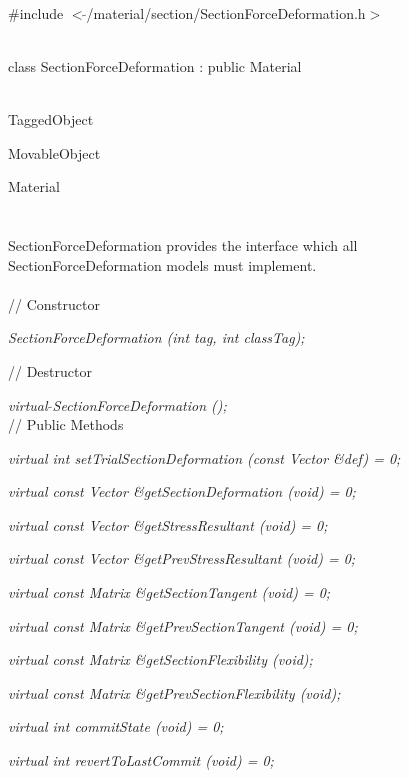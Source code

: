 
   \\
\#include $<\tilde{ }$/material/section/SectionForceDeformation.h$>$  


  \\
class SectionForceDeformation : public Material 


 \\
TaggedObject 

MovableObject 

\indent\indent Material \\
\indent\indent{} \\

  \\
\indent SectionForceDeformation provides the interface which all
SectionForceDeformation models must implement. \\

 \\
// Constructor 

{\em SectionForceDeformation (int tag, int classTag);} 

// Destructor 

{\em virtual $\tilde{ }$SectionForceDeformation ();}\\ 

// Public Methods 

{\em virtual int setTrialSectionDeformation (const Vector \&def) = 0; } 

{\em virtual const Vector \&getSectionDeformation (void) = 0; } 

{\em virtual const Vector \&getStressResultant (void) = 0; } 

{\em virtual const Vector \&getPrevStressResultant (void) = 0; } 

{\em virtual const Matrix \&getSectionTangent (void) = 0; } 

{\em virtual const Matrix \&getPrevSectionTangent (void) = 0; } 

{\em virtual const Matrix \&getSectionFlexibility (void); } 

{\em virtual const Matrix \&getPrevSectionFlexibility (void); } 

{\em virtual int commitState (void) = 0; } 

{\em virtual int revertToLastCommit (void) = 0; } 

